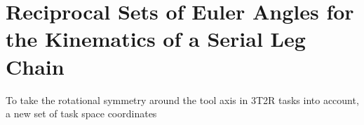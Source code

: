\documentclass[robotics,article,accept,moreauthors,pdftex]{Definitions/mdpi}
\begin{document}

\section{Reciprocal Sets of Euler Angles for the Kinematics of a Serial Leg Chain}
\label{sec:REW_seriell}


To take the rotational symmetry around the tool axis in 3T2R tasks into account, a new set of task space coordinates
\end{document}

